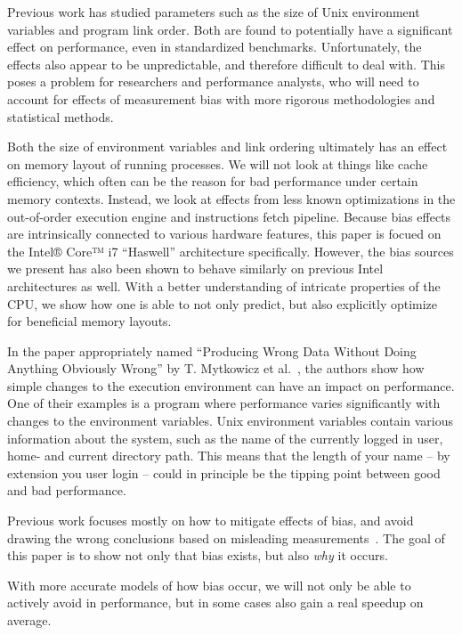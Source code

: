 \documentclass[a4paper,10pt,twocolumn,twoside]{article}
\begin{document}
Previous work has studied parameters such as the size of Unix environment variables and program link order. 
Both are found to potentially have a significant effect on performance, even in standardized benchmarks. 
Unfortunately, the effects also appear to be unpredictable, and therefore difficult to deal with. 
This poses a problem for researchers and performance analysts, who will need to account for effects of measurement bias with more rigorous methodologies and statistical methods.

Both the size of environment variables and link ordering ultimately has an effect on memory layout of running processes. 
We will not look at things like cache efficiency, which often can be the reason for bad performance under certain memory contexts. 
Instead, we look at effects from less known optimizations in the out-of-order execution engine and instructions fetch pipeline. 
Because bias effects are intrinsically connected to various hardware features, this paper is focued on the Intel® Core™ i7 “Haswell” architecture specifically. 
However, the bias sources we present has also been shown to behave similarly on previous Intel architectures as well.
With a better understanding of intricate properties of the CPU, we show how one is able to not only predict, but also explicitly optimize for beneficial memory layouts. 

In the paper appropriately named “Producing Wrong Data Without Doing Anything Obviously Wrong” by T. Mytkowicz et al.~\cite{Mytkowicz:2009:WrongData}, the authors show how simple changes to the execution environment can have an impact on performance. 
One of their examples is a program where performance varies significantly with changes to the environment variables. 
Unix environment variables contain various information about the system, such as the name of the currently logged in user, home- and current directory path.
This means that the length of your name -- by extension you user login -- could in principle be the tipping point between good and bad performance.

Previous work focuses mostly on how to mitigate effects of bias, and avoid drawing the wrong conclusions based on misleading measurements~\cite{Mytkowicz:2008:Easy, Mytkowicz:2009:WrongData}.
The goal of this paper is to show not only that bias exists, but also \emph{why} it occurs. 

With more accurate models of how bias occur, we will not only be able to actively avoid in performance, but in some cases also gain a real speedup on average.
\end{document}
